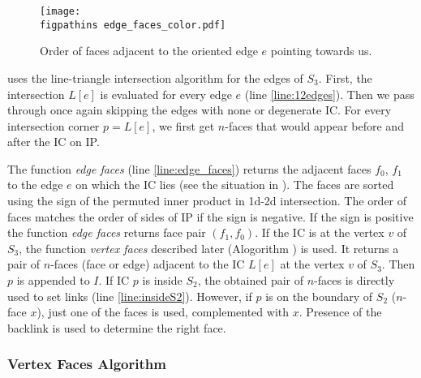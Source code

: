 \begin{figure}%
  \begin{center}        
    \texttt{[image: \\figpathins edge\_faces\_color.pdf]}
  \end{center}
  \caption{Order of faces adjacent to the oriented edge $e$ pointing towards us.}
  \label{fig:edge_faces}
\end{figure}

 uses the line-triangle intersection algorithm for the edges of $S_3$.
First, the intersection $L[e]$ is evaluated for every edge $e$ (line \ref{line:12edges}).  Then we pass through once 
again skipping the edges with none or degenerate IC. For every intersection corner $p=L[e]$, we first get $n$-faces 
that would appear before and after the IC on IP.

The function \emph{edge faces} (line \ref{line:edge_faces}) returns the adjacent faces $f_0$, $f_1$ to the edge $e$
on which the IC lies (see the situation in ). 
The faces are sorted using the sign of the permuted inner product in 1d-2d intersection. The order of faces matches 
the order of sides of IP if the sign is negative. If the sign is positive the function \emph{edge faces} returns face pair $(f_1, f_0)$.
If the IC is at the vertex $v$ of $S_3$, the function \emph{vertex faces} described later (Alogorithm ) is used.
It returns a pair of $n$-faces (face or edge) adjacent to the IC $L[e]$ at the vertex $v$ of $S_3$. 
Then $p$ is appended to $I$. If IC $p$ is inside $S_2$, the obtained pair of $n$-faces is directly used to set links (line \ref{line:insideS2}).
However, if $p$ is on the boundary of $S_2$ ($n$-face $x$), just one of the faces is used, complemented with $x$. Presence of the backlink 
is used to determine the right face. 

\subsubsection{Vertex Faces Algorithm}

